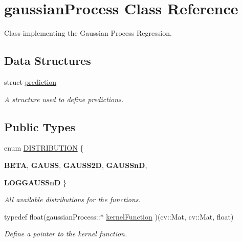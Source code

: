 \hypertarget{classgaussianProcess}{
\section{gaussianProcess Class Reference}
\label{classgaussianProcess}
}


Class implementing the Gaussian Process Regression.  


\subsection*{Data Structures}
\begin{DoxyCompactItemize}
\item 
struct \hyperlink{structgaussianProcess_1_1prediction}{prediction}
\begin{DoxyCompactList}\small\item\em A structure used to define predictions. \item\end{DoxyCompactList}\end{DoxyCompactItemize}
\subsection*{Public Types}
\begin{DoxyCompactItemize}
\item 
enum \hyperlink{classgaussianProcess_ade80fdcd8f2dde57393f56d0cdfaeed0}{DISTRIBUTION} \{ \par
{\bfseries BETA}, 
{\bfseries GAUSS}, 
{\bfseries GAUSS2D}, 
{\bfseries GAUSSnD}, 
\par
{\bfseries LOGGAUSSnD}
 \}
\begin{DoxyCompactList}\small\item\em All available distributions for the functions. \item\end{DoxyCompactList}\item 
\hypertarget{classgaussianProcess_a9255dbcbf2dc6ef9723b538659acd491}{
typedef float(gaussianProcess::$\ast$ \hyperlink{classgaussianProcess_a9255dbcbf2dc6ef9723b538659acd491}{kernelFunction} )(cv::Mat, cv::Mat, float)}
\label{classgaussianProcess_a9255dbcbf2dc6ef9723b538659acd491}

\begin{DoxyCompactList}\small\item\em Define a pointer to the kernel function. \item\end{DoxyCompactList}\end{DoxyCompactItemize}
